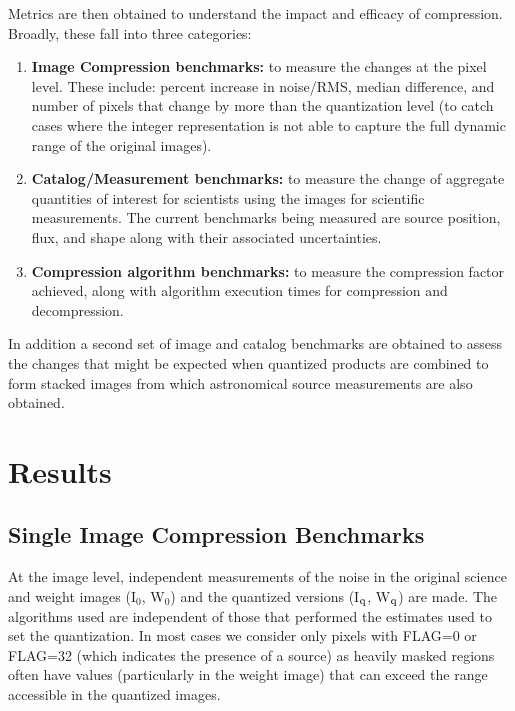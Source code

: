 Metrics are then obtained to understand the impact and efficacy of compression.  Broadly, 
these fall into three categories:
\begin{enumerate}
\item {\bf Image Compression benchmarks:} to measure the changes at the pixel level.  These
include: percent increase in noise/RMS, median difference, and number of pixels that change
by more than the quantization level (to catch cases where the integer representation is not 
able to capture the full dynamic range of the original images).

\item {\bf Catalog/Measurement benchmarks:} to measure the change of aggregate quantities
of interest for scientists using the images for scientific measurements.  The current
benchmarks being measured are source position, flux, and shape along with their associated
uncertainties.

\item {\bf Compression algorithm benchmarks:} to measure the compression factor achieved, along with
algorithm execution times for compression and decompression.
\end{enumerate}
In addition a second set of image and catalog benchmarks are obtained to assess
the changes that might be expected when quantized products are combined to form stacked
images from which astronomical source measurements are also obtained.



\section{Results}

\subsection{Single Image Compression Benchmarks}

At the image level, independent measurements of the noise in the original science 
and weight images (I$_{0}$, W$_{0}$) and the quantized versions (I$_{\rm q}$, W$_{\rm q}$) are made.
The algorithms used are independent of those that performed the estimates used to set the quantization.
In most cases we consider only pixels with FLAG=0 or FLAG=32 (which indicates the presence of a source)
as heavily masked regions often have values (particularly in the weight image) that can exceed the 
range accessible in the quantized images.  

